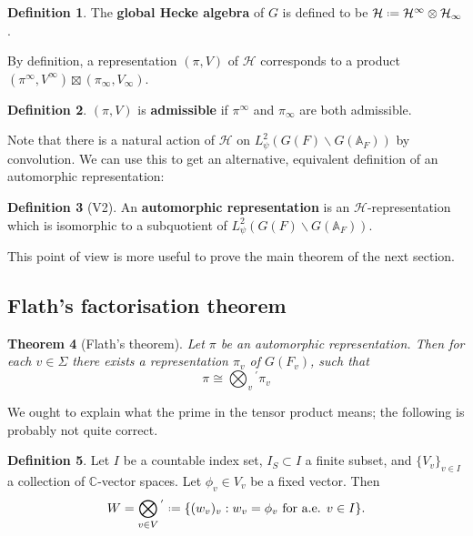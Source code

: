 \documentclass[11pt]{report}
\let\mbb\mathbb
\let\mc\mathcal
\newcommand{\1}{\mathbbm 1}
\newcommand{\C}{\mathbb{C}}
\newcommand{\A}{\mbb A}
\newcommand*{\defeq}{\mathrel{\vcenter{\baselineskip0.5ex \lineskiplimit0pt
      \hbox{\scriptsize.}\hbox{\scriptsize.}}}%
  =}
\theoremstyle{plain}
\newtheorem{thm}{Theorem}[section]
\newcounter{ex}
\theoremstyle{definition}
\newtheorem{mydef}[thm]{Definition}
\theoremstyle{remark}
\numberwithin{equation}{section}
\begin{document}
\begin{mydef}
  The \textbf{global Hecke algebra} of $G$ is defined to be $\mc H
  \defeq \mc
  H^{\infty}\otimes \mc H_{\infty}$.
\end{mydef}
By definition, a representation $(\pi, V)$ of $\mc H$ corresponds to a
product $(\pi^{\infty},V^{\infty}) \boxtimes (\pi_{\infty},V_{\infty})$. 

\begin{mydef}
  $(\pi,V)$ is \textbf{admissible} if $\pi^{\infty}$ and $\pi_{\infty}$ are both admissible.
\end{mydef}

Note that there is a natural action of $\mc H$ on $L^{2}_{\psi}(G(F) \backslash
G(\A_{F}))$ by convolution. We can use this to get an alternative, equivalent
definition of an automorphic representation:

\begin{mydef}[V2]
  An \textbf{automorphic representation} is an $\mc H$-representation
  which is isomorphic to a subquotient of
  $L^{2}_{\psi}(G(F) \backslash G(\A_{F}))$. 
\end{mydef}

This point of view is more useful to prove the main theorem of the
next section.

\subsection{Flath's factorisation theorem}
\label{sec:flaths-fact-theor}

\begin{thm}[Flath's theorem]
  Let $\pi$ be an automorphic representation. Then for each $v\in \Sigma$ there
  exists a representation $\pi_{v}$ of $G(F_{v})$, such that
  \begin{equation}
    \label{eq:14}
\pi \cong \bigotimes_{v}{}^{\! '}\pi_{v}
  \end{equation} 
\end{thm}
We ought to explain what the prime in the tensor product means; the
following is probably not quite correct.

\begin{mydef}
  Let $I$ be a countable index set, $I_{S}\subset I$ a finite subset, and
  $\{V_{v}\}_{v \in I}$ a collection of $\C$-vector spaces. Let
  $\phi_{v} \in V_{v}$ be a fixed vector. Then
  \begin{equation}
    \label{eq:15}
    W = \bigotimes_{v \in V}{}^{'} \defeq \{(w_{v})_{v} : w_{v} = \phi_{v}
    \text{ for a.e. } v \in I \}.
  \end{equation}
\end{mydef}
\end{document}
